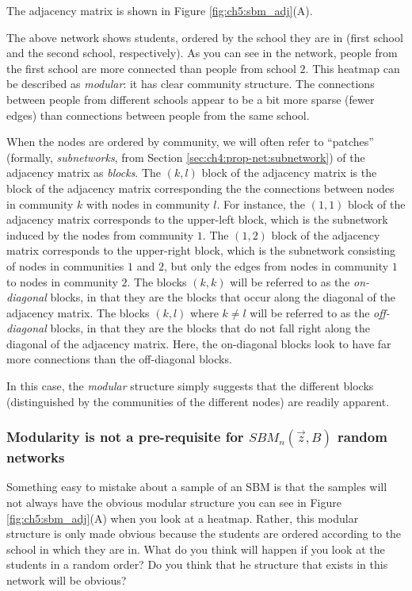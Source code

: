 The adjacency matrix is shown in Figure \ref{fig:ch5:sbm_adj}(A).

The above network shows students, ordered by the school they are in (first school and the second school, respectively). As you can see in the network, people from the first school are more connected than people from school $2$. This heatmap can be described as \textit{modular}: it has clear community structure. The connections between people from different schools appear to be a bit {more sparse} (fewer edges) than connections between people from the same school.

When the nodes are ordered by community, we will often refer to ``patches'' (formally, \textit{subnetworks}, from Section \ref{sec:ch4:prop-net:subnetwork}) of the adjacency matrix as \textit{blocks}. The $(k, l)$ block of the adjacency matrix is the block of the adjacency matrix corresponding the the connections between nodes in community $k$ with nodes in community $l$. For instance, the $(1, 1)$ block of the adjacency matrix corresponds to the upper-left block, which is the subnetwork induced by the nodes from community $1$. The $(1,2)$ block of the adjacency matrix corresponds to the upper-right block, which is the subnetwork consisting of nodes in communities $1$ and $2$, but only the edges from nodes in community $1$ to nodes in community $2$. The blocks $(k, k)$ will be referred to as the \textit{on-diagonal} blocks, in that they are the blocks that occur along the diagonal of the adjacency matrix. The blocks $(k, l)$ where $k \neq l$ will be referred to as the \textit{off-diagonal} blocks, in that they are the blocks that do not fall right along the diagonal of the adjacency matrix. Here, the on-diagonal blocks look to have far more connections than the off-diagonal blocks.

In this case, the \textit{modular} structure simply suggests that the different blocks (distinguished by the communities of the different nodes) are readily apparent.


\subsubsection{Modularity is not a pre-requisite for $SBM_n(\vec z, B)$ random networks}
\label{sec:ch5:sbm:modularity}

Something easy to mistake about a sample of an SBM is that the samples will {not always} have the obvious modular structure you can see in Figure \ref{fig:ch5:sbm_adj}(A) when you look at a heatmap. Rather, this modular structure is {only} made obvious because the students are ordered according to the school in which they are in. What do you think will happen if you look at the students in a random order? Do you think that he structure that exists in this network will be obvious?


